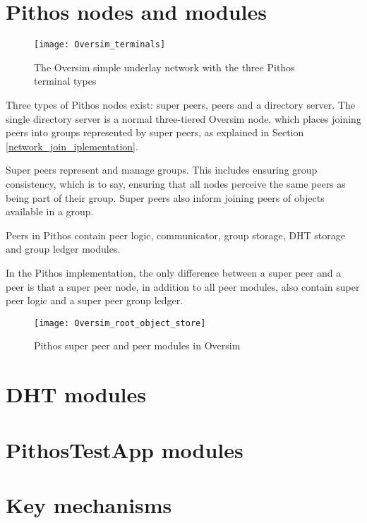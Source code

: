 \section{Pithos nodes and modules}

\begin{figure}[htbp]
 \centering
 \texttt{[image: Oversim\_terminals]}
 \caption{The Oversim simple underlay network with the three Pithos terminal types}
 \label{fig_oversim_terminals}
\end{figure}

Three types of Pithos nodes exist: super peers, peers and a directory server. The single directory server is a normal three-tiered Oversim node, which places joining peers into groups represented by super peers, as explained in Section \ref{network_join_iplementation}.

Super peers represent and manage groups. This includes ensuring group consistency, which is to say, ensuring that all nodes perceive the same peers as being part of their group. Super peers also inform joining peers of objects available in a group.

Peers in Pithos contain peer logic, communicator, group storage, DHT storage and group ledger modules.

In the Pithos implementation, the only difference between a super peer and a peer is that a super peer node, in addition to all peer modules, also contain super peer logic and a super peer group ledger.

\begin{figure}[htbp]
 \centering
 \texttt{[image: Oversim\_root\_object\_store]}
 \caption{Pithos super peer and peer modules in Oversim}
 \label{fig_oversim_root_object_store}
\end{figure}

\section{DHT modules}

\section{PithosTestApp modules}

\section{Key mechanisms}
